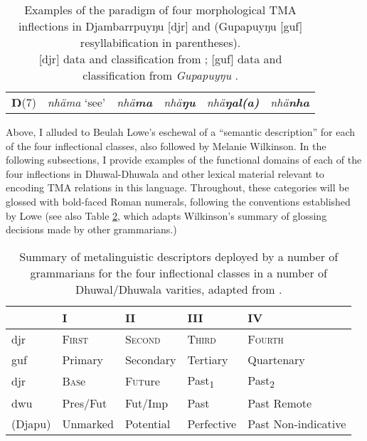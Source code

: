 \begin{table}[h]
\begin{tabular}{rl|>{\it}l>{\it}l>{\it}l>{\it}l}
		\textbf{Ŋ}\hfill(7)& \textit{nhäma} `see' & \textit{nhä\textbf{ma}} & \textit{nhä\textbf{ŋu}} & \textit{nhä\textbf{ŋal(a)}} & \textit{nhä\textbf{nha}}\\
	\end{tabular}
	\caption{Examples of the paradigm of four morphological TMA inflections in Djambarrpuyŋu [\gls{djr}] and (Gupapuyŋu [\gls{guf}] resyllabification in parentheses).\\{}[\gls{djr}] data and classification from \citet{Wilkinson1991}; [\gls{guf}] data and classification from \textit{Gupapuyŋu} \citeyearpar{Lowe1996}.} \label{djr-pdm-exx}
\end{table}


Above, I alluded to Beulah Lowe's eschewal of a ``semantic description'' for each of the four inflectional classes, also followed by Melanie Wilkinson. In the following subsections, I provide examples of the functional domains of each of the four inflections in Dhuwal-Dhuwala and other lexical material relevant to encoding TMA relations in this language. Throughout, these categories will be glossed with bold-faced Roman numerals, following the conventions established by Lowe (see also Table \ref{Infl-Comparisons-Wilk}, which adapts Wilkinson's summary of glossing decisions made by other grammarians.)%


\begin{table}[h]
	\begin{tabular}{l|llll}
		&	\textbf{I}	& \textbf{II}	&	\textbf{III}	&	\textbf{IV}\\\midrule
		\citealt{Wilkinson1991} \gls{djr} &\textsc{First}&\textsc{Second}&\textsc{Third}&\textsc{Fourth}\\
		\citealt{Lowe1996} \gls{guf}\footnotemark &Primary&Secondary&Tertiary&Quartenary\\
		\citealt{Tchekhoff1983} \gls{djr}&\textsc{Bas}e&\textsc{Fut}ure&Past\textsubscript1&Past\textsubscript2\\
		\citealt{Heath1980} \gls{dwu} & Pres/Fut & Fut/Imp & Past & Past Remote\\
		\citealt{Morphy1983} (Djapu) & Unmarked & Potential & Perfective & Past Non-indicative\\
	\end{tabular}
	\caption{Summary of metalinguistic descriptors deployed by a number of grammarians for the four inflectional classes in a number of Dhuwal/Dhuwala varities, adapted from \citet[336]{Wilkinson1991}.}\label{Infl-Comparisons-Wilk}
\end{table}	


